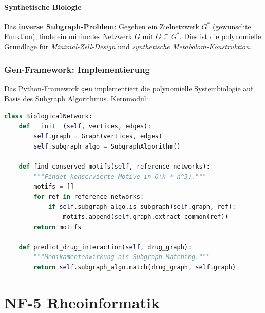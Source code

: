 ﻿\documentclass[a4paper,12pt]{scrreprt}
\theoremstyle{definition}
\begin{document}
\subsection{Synthetische Biologie}

Das \textbf{inverse Subgraph-Problem}: Gegeben ein Zielnetzwerk $G^*$
(gewünschte Funktion), finde ein minimales Netzwerk $G$ mit
$G \subseteq G^*$. Dies ist die polynomielle Grundlage für
\emph{Minimal-Zell-Design} und \emph{synthetische Metabolom-Konstruktion}.

\section{Gen-Framework: Implementierung}

Das Python-Framework \texttt{gen} implementiert die polynomielle
Systembiologie auf Basis des Subgraph Algorithmus. Kernmodul:

\begin{lstlisting}[language=Python,caption={Biologische Netzwerkanalyse}]
class BiologicalNetwork:
    def __init__(self, vertices, edges):
        self.graph = Graph(vertices, edges)
        self.subgraph_algo = SubgraphAlgorithm()

    def find_conserved_motifs(self, reference_networks):
        """Findet konservierte Motive in O(k * n^3)."""
        motifs = []
        for ref in reference_networks:
            if self.subgraph_algo.is_subgraph(self.graph, ref):
                motifs.append(self.graph.extract_common(ref))
        return motifs

    def predict_drug_interaction(self, drug_graph):
        """Medikamentenwirkung als Subgraph-Matching."""
        return self.subgraph_algo.match(drug_graph, self.graph)
\end{lstlisting}

\part{NF-5 \quad Rheoinformatik}
\label{part:nf5}

\end{document}
